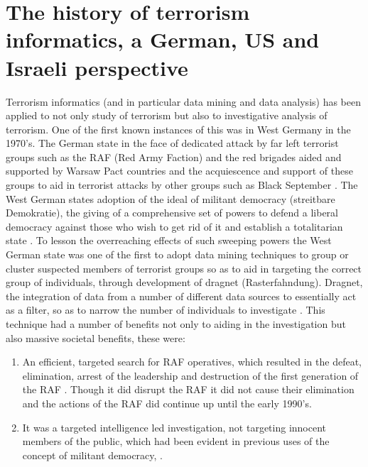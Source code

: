 \section{The history of terrorism informatics, a German, US and Israeli perspective}
Terrorism informatics (and in particular data mining and data analysis) has been applied to not only study of terrorism but also to investigative analysis of terrorism. One of the first known instances of this was in West Germany in the 1970's. The German state in the face of dedicated attack by far left terrorist  groups such as the RAF (Red Army Faction) and the red brigades aided and supported by Warsaw Pact countries \citep{leighton2014strange} and the acquiescence and support of these groups to aid in terrorist attacks by other groups such as Black September
\citep{nacos2016terrorism}. The West German states adoption of the ideal of militant democracy (streitbare Demokratie), the giving of a comprehensive set of powers to defend a liberal democracy against those who wish to get rid of it and establish a totalitarian state \citep{rosenfeld2014militant}. To lesson the overreaching effects of such sweeping powers the West German state was one of the first to adopt data mining techniques to group or cluster suspected members of terrorist groups so as to aid in targeting the correct group of individuals, through development of dragnet (Rasterfahndung). Dragnet, the integration of data from a number of different data sources to essentially act as  a filter, so as to narrow the number of individuals to investigate \citep{weinhauer2014terror}. This technique had a number of benefits not only to aiding in the investigation but also massive societal benefits, these were:
\begin{enumerate}
\item An efficient, targeted search for RAF operatives, which resulted in the defeat, elimination, arrest of the leadership \citep{hauser1997baader} and destruction of the first generation of the RAF \citep{weinhauer2006terrorismus}. Though it did disrupt the RAF it did not cause their elimination and the actions of the RAF did continue up until the early 1990's.
\item It was a targeted intelligence led investigation, not targeting innocent members of the public, which had been evident in previous uses of the concept of militant democracy, \citep{de2010counter}.
\end{enumerate}

